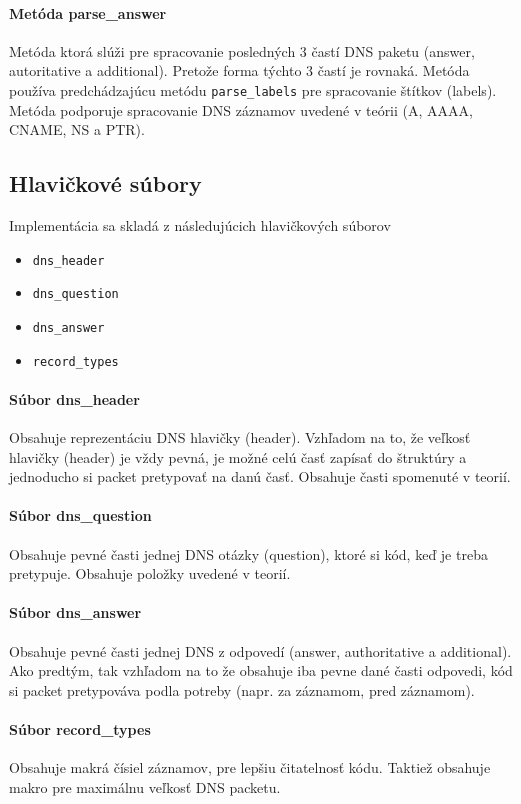 \documentclass[titlepage]{article}
\begin{document}
\paragraph{Metóda parse\_answer}
Metóda ktorá slúži pre spracovanie posledných 3 častí DNS paketu (answer, autoritative a additional). Pretože 
forma týchto 3 častí je rovnaká. Metóda používa predchádzajúcu metódu \verb|parse_labels| pre spracovanie štítkov (labels).
Metóda podporuje spracovanie DNS záznamov uvedené v teórii (A, AAAA, CNAME, NS a PTR).

\subsection{Hlavičkové súbory}
Implementácia sa skladá z následujúcich hlavičkových súborov
\begin{itemize}
    \item \verb|dns_header|
    \item \verb|dns_question|
    \item \verb|dns_answer|
    \item \verb|record_types|
\end{itemize}

\paragraph{Súbor dns\_header}
Obsahuje reprezentáciu DNS hlavičky (header). Vzhľadom na to, že veľkosť hlavičky (header) je vždy pevná, je možné 
celú časť zapísať do štruktúry a jednoducho si packet pretypovať na danú časť. Obsahuje časti spomenuté v teorií.

\paragraph{Súbor dns\_question}
Obsahuje pevné časti jednej DNS otázky (question), ktoré si kód, keď je treba pretypuje. Obsahuje položky uvedené v teorií.

\paragraph{Súbor dns\_answer}
Obsahuje pevné časti jednej DNS z odpovedí (answer, authoritative a additional). Ako predtým, tak vzhľadom na to že obsahuje iba
pevne dané časti odpovedi, kód si packet pretypováva podla potreby (napr. za záznamom, pred záznamom).

\paragraph{Súbor record\_types}
Obsahuje makrá čísiel záznamov, pre lepšiu čitatelnosť kódu. Taktiež obsahuje makro pre maximálnu veľkosť DNS packetu.
\end{document}
